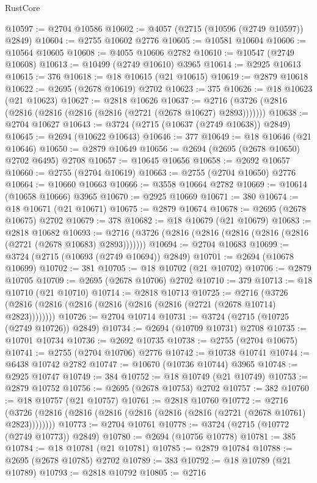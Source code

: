 \begin{lexlean}{RustCore}
\begin{coremodule}
@10597 := @2704 @10586
@10602 := @4057 (@2715 (@10596 (@2749 @10597)) @2849)
@10604 := @2755 @10602 @2776
@10605 := @10581 @10604
@10606 := @10564 @10605
@10608 := @4055 @10606 @2782
@10610 := @10547 (@2749 @10608)
@10613 := @10499 (@2749 @10610) @3965
@10614 := @2925 @10613
@10615 := 376
@10618 := @18 @10615 (@21 @10615)
@10619 := @2879 @10618
@10622 := @2695 (@2678 @10619) @2702
@10623 := 375
@10626 := @18 @10623 (@21 @10623)
@10627 := @2818 @10626
@10637 := @2716 (@3726 (@2816 (@2816 (@2816 (@2816 (@2816 (@2721 (@2678 @10627) @2893)))))))
@10638 := @2704 @10627
@10643 := @3724 (@2715 (@10637 (@2749 @10638)) @2849)
@10645 := @2694 (@10622 @10643)
@10646 := 377
@10649 := @18 @10646 (@21 @10646)
@10650 := @2879 @10649
@10656 := @2694 (@2695 (@2678 @10650) @2702 @6495) @2708
@10657 := @10645 @10656
@10658 := @2692 @10657
@10660 := @2755 (@2704 @10619)
@10663 := @2755 (@2704 @10650) @2776
@10664 := @10660 @10663
@10666 := @3558 @10664 @2782
@10669 := @10614 (@10658 @10666) @3965
@10670 := @2925 @10669
@10671 := 380
@10674 := @18 @10671 (@21 @10671)
@10675 := @2879 @10674
@10678 := @2695 (@2678 @10675) @2702
@10679 := 378
@10682 := @18 @10679 (@21 @10679)
@10683 := @2818 @10682
@10693 := @2716 (@3726 (@2816 (@2816 (@2816 (@2816 (@2816 (@2721 (@2678 @10683) @2893)))))))
@10694 := @2704 @10683
@10699 := @3724 (@2715 (@10693 (@2749 @10694)) @2849)
@10701 := @2694 (@10678 @10699)
@10702 := 381
@10705 := @18 @10702 (@21 @10702)
@10706 := @2879 @10705
@10709 := @2695 (@2678 @10706) @2702
@10710 := 379
@10713 := @18 @10710 (@21 @10710)
@10714 := @2818 @10713
@10725 := @2716 (@3726 (@2816 (@2816 (@2816 (@2816 (@2816 (@2816 (@2721 (@2678 @10714) @2823))))))))
@10726 := @2704 @10714
@10731 := @3724 (@2715 (@10725 (@2749 @10726)) @2849)
@10734 := @2694 (@10709 @10731) @2708
@10735 := @10701 @10734
@10736 := @2692 @10735
@10738 := @2755 (@2704 @10675)
@10741 := @2755 (@2704 @10706) @2776
@10742 := @10738 @10741
@10744 := @6438 @10742 @2782
@10747 := @10670 (@10736 @10744) @3965
@10748 := @2925 @10747
@10749 := 384
@10752 := @18 @10749 (@21 @10749)
@10753 := @2879 @10752
@10756 := @2695 (@2678 @10753) @2702
@10757 := 382
@10760 := @18 @10757 (@21 @10757)
@10761 := @2818 @10760
@10772 := @2716 (@3726 (@2816 (@2816 (@2816 (@2816 (@2816 (@2816 (@2721 (@2678 @10761) @2823))))))))
@10773 := @2704 @10761
@10778 := @3724 (@2715 (@10772 (@2749 @10773)) @2849)
@10780 := @2694 (@10756 @10778)
@10781 := 385
@10784 := @18 @10781 (@21 @10781)
@10785 := @2879 @10784
@10788 := @2695 (@2678 @10785) @2702
@10789 := 383
@10792 := @18 @10789 (@21 @10789)
@10793 := @2818 @10792
@10805 := @2716

\end{coremodule}
\end{lexlean}
